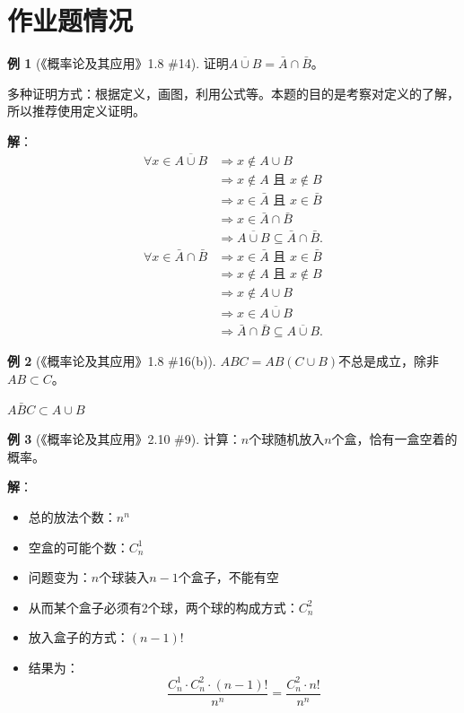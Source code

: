 \documentclass[11pt,a4paper]{report}
\theoremstyle{definition}
\newtheorem{example}{例}[chapter]
\theoremstyle{plain}
\begin{document}
\section{作业题情况}

\begin{example}[《概率论及其应用》1.8 \#14]
证明$\overline{A\cup B}=\bar{A}\cap\bar{B}$。

多种证明方式：根据定义，画图，利用公式等。本题的目的是考察对定义的了解，所以推荐使用定义证明。

\textbf{解}：
\[
\begin{aligned}
\forall x\in\overline{A\cup B}&\Rightarrow x\not\in A\cup B\\
&\Rightarrow x\not\in A\text{ 且 }x\not\in B\\
&\Rightarrow x\in\bar{A}\text{ 且 }x\in\bar{B}\\
&\Rightarrow x\in\bar{A}\cap\bar{B}\\
&\Rightarrow\overline{A\cup B}\subseteq\bar{A}\cap\bar{B}.
\end{aligned}
\]
\[
\begin{aligned}
\forall x\in\bar{A}\cap\bar{B}&\Rightarrow x\in\bar{A}\text{ 且 }x\in\bar{B}\\
&\Rightarrow x\not\in A\text{ 且 }x\not\in B\\
&\Rightarrow x\not\in A\cup B\\
&\Rightarrow x\in\overline{A\cup B}\\
&\Rightarrow\bar{A}\cap\bar{B}\subseteq\overline{A\cup B}.
\end{aligned}
\]
\end{example}

\begin{example}[《概率论及其应用》1.8 \#16(b)]
$ABC=AB(C\cup B)$不总是成立，除非$AB\subset C$。

$A\bar{B}C\subset A\cup B$
\end{example}

\begin{example}[《概率论及其应用》2.10 \#9]
计算：$n$个球随机放入$n$个盒，恰有一盒空着的概率。

\textbf{解}：
\begin{itemize}[leftmargin=2em]
    \item 总的放法个数：$n^n$
    \item 空盒的可能个数：$C_n^1$
    \item 问题变为：$n$个球装入$n-1$个盒子，不能有空
    \item 从而某个盒子必须有2个球，两个球的构成方式：$C_n^2$
    \item 放入盒子的方式：$(n-1)!$
    \item 结果为：
    \[
    \frac{C_n^1\cdot C_n^2\cdot(n-1)!}{n^n}=\frac{C_n^2\cdot n!}{n^n}
    \]
\end{itemize}
\end{example}
\end{document}
